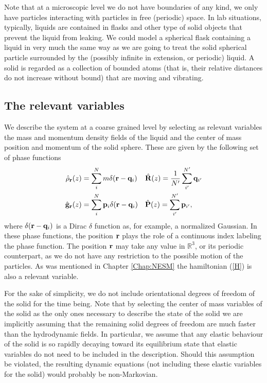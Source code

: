 \documentclass[b5paper,openright,10pt]{book}
\begin{document}
Note that at a microscopic level we do not have boundaries of
  any kind, we only have particles interacting with particles in free
(periodic) space.  In lab  situations, typically, liquids are contained
in flasks and other type of  solid objects that prevent the liquid from
leaking.  We could model a spherical  flask containing a liquid in very
much  the same  way  as we  are  going to  treat  the solid  spherical
particle  surrounded  by  the  (possibly  infinite  in  extension,  or
periodic)  liquid. A solid is
  regarded as a collection of  bounded atoms (that is, their relative
distances  do  not  increase  without   bound)  that  are  moving  and
vibrating. 

\subsection{The relevant variables}
We describe the system at a coarse grained level by selecting as
relevant variables the mass and momentum density fields  of the liquid
and  the   center  of  mass   position  and  momentum  of   the  solid
sphere. These are given by the following set of phase functions 
\begin{align}
  \hat{\rho}_{\bf r}(z) &=\sum^{N}_im\delta({\bf r}-{\bf q}_i)
&&\hat{\bf R}(z)=\frac{1}{N'}\sum_{i'}^{N'}{\bf q}_{i'}
\nonumber\\
  \hat{\bf g}_{\bf r}(z) &=\sum^{N}_i{\bf p}_i\delta({\bf r}-{\bf q}_i)
&&\hat{\bf P}(z)=\sum_{i'}^{N'}{\bf p}_{i'},
\label{CGvar}
\end{align}
where $\delta({\bf r}-{\bf q}_i)$ is a Dirac $\delta$ function as, for example, a normalized Gaussian.
In these phase  functions, the position ${\bf r}$ plays  the role of a
continuous index labeling  the phase function. The  position ${\bf r}$
may take any value in  $\mathbb{R}^3$, or its periodic counterpart, as
we  do  not  have  any  restriction to  the  possible  motion  of  the
particles. As was mentioned in Chapter \ref{Chap:NESM} the hamiltonian (\ref{H}) is also a relevant variable.

For the sake of simplicity, we do not include orientational degrees of
freedom of the  solid for the time being.  Note  that by selecting the
center of  mass variables of the  solid as the only  ones necessary to
describe the  state of the solid  we are implicitly assuming  that the
remaining  solid  degrees   of  freedom  are  much   faster  than  the
hydrodynamic  fields.   In  particular,  we assume  that  any  elastic
behaviour of the solid is  so rapidly decaying toward its equilibrium
state  that elastic  variables  do  not need  to  be  included in  the
description. Should this assumption be violated, the resulting dynamic
equations (not including  these elastic variables for the solid)
would probably  be non-Markovian.
\end{document}
